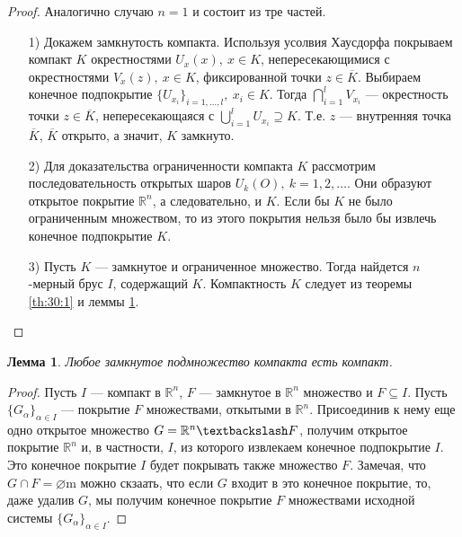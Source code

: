 \documentclass[12pt]{report}
\numberwithin{equation}{section}
\newtheorem{lemma}{Лемма}[section]
\begin{document}
\begin{proof}
Аналогично случаю $n = 1$ и состоит из тре частей.
\begin{enumerate}

\item[1)] Докажем замкнутость компакта. Используя усолвия Хаусдорфа покрываем компакт $K$ окрестностями $U_x(x),~x \in K$, непересекающимися с окрестностями $V_x(z),~x \in K$, фиксированной точки $z \in \overline{K}$. Выбираем конечное подпокрытие $\{ U_{x_i}\}_{i = 1, \ldots, l},~x_i \in K$. Тогда $\bigcap\limits_{i = 1}^l V_{x_i}$ --- окрестность точки $z \in \overline{K}$, непересекающаяся с $\bigcup\limits_{i  = 1}^l U_{x_i} \supseteq K$. Т.е. $z$ --- внутренняя точка $\overline{K}$, $\overline{K}$ открыто, а значит, $K$ замкнуто.
\item[2)] Для доказательства ограниченности компакта $K$ рассмотрим последовательность открытых шаров $U_k(O),~k=1,2,\ldots$. Они образуют открытое покрытие $\mathbb{R}^n$, а следовательно, и $K$. Если бы $K$ не было ограниченным множеством, то из этого покрытия нельзя было бы извлечь конечное подпокрытие $K$.
\item[3)] Пусть $K$ --- замкнутое и ограниченное множество. Тогда найдется $n$-мерный брус $I$, содержащий $K$. Компактность $K$ следует из теоремы \ref{th:30:1} и леммы \ref{lemm:31:1}.
\end{enumerate}
\end{proof}

\begin{lemma} \label{lemm:31:1}
Любое замкнутое подмножество компакта есть компакт.
\end{lemma}
\begin{proof}
Пусть $I$ --- компакт в $\mathbb{R}^n$, $F$ --- замкнутое в $\mathbb{R}^n$ множество и $F \subseteq I$. Пусть $\{ G_{\alpha} \}_{\alpha \in I}$ --- покрытие $F$ множествами, откытыми в $\mathbb{R}^n$. Присоединив к нему еще одно открытое множество $G = \mathbb{R}^n \textbackslash F$, получим открытое покрытие $\mathbb{R}^n$ и, в частности, $I$, из которого извлекаем конечное подпокрытие $I$. Это конечное покрытие $I$ будет покрывать также множество $F$. Замечая, что $G \cap F = \varnothing$m можно скзаать, что если $G$ входит в это конечное покрытие, то, даже удалив $G$, мы получим конечное покрытие $F$ множествами исходной системы $\{ G_{\alpha}\}_{\alpha \in I}$.
\end{proof}
\end{document}
